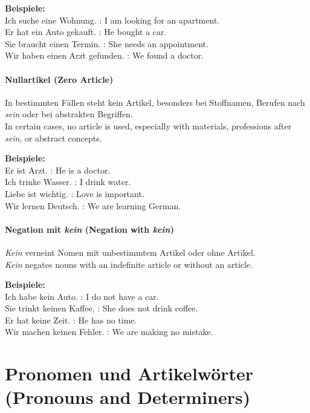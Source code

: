 \documentclass[a4paper]{article}
\begin{document}
        \textbf{Beispiele:}\\
        Ich suche eine Wohnung. : I am looking for an apartment.\\
        Er hat ein Auto gekauft. : He bought a car.\\
        Sie braucht einen Termin. : She needs an appointment.\\
        Wir haben einen Arzt gefunden. : We found a doctor.
    
    \paragraph{Nullartikel {\small (Zero Article)}}
        In bestimmten Fällen steht kein Artikel, besonders bei Stoffnamen, Berufen nach \textit{sein} oder bei abstrakten Begriffen.\\
        In certain cases, no article is used, especially with materials, professions after \textit{sein}, or abstract concepts.
        
        \textbf{Beispiele:}\\
        Er ist Arzt. : He is a doctor.\\
        Ich trinke Wasser. : I drink water.\\
        Liebe ist wichtig. : Love is important.\\
        Wir lernen Deutsch. : We are learning German.
    
    \paragraph{Negation mit \textit{kein} {\small (Negation with \textit{kein})}}
        \textit{Kein} verneint Nomen mit unbestimmtem Artikel oder ohne Artikel.\\
        \textit{Kein} negates nouns with an indefinite article or without an article.
        
        \textbf{Beispiele:}\\
        Ich habe kein Auto. : I do not have a car.\\
        Sie trinkt keinen Kaffee. : She does not drink coffee.\\
        Er hat keine Zeit. : He has no time.\\
        Wir machen keinen Fehler. : We are making no mistake.
    
    
    \section{Pronomen und Artikelwörter {\small (Pronouns and Determiners)}}
    
\end{document}

